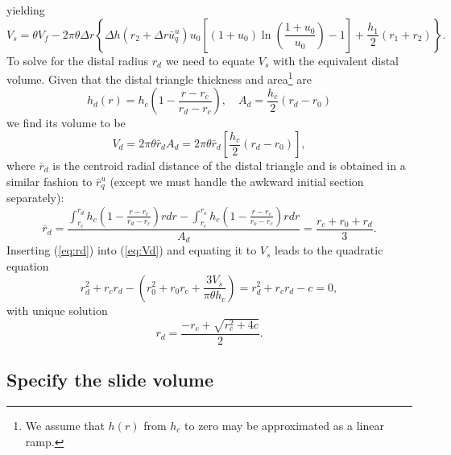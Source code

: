 yielding
\begin{equation}
V_s = \theta V_f - 2 \pi \theta \Delta r \left \{ \Delta h \left ( r_2 + \Delta r\bar{u}_q^u \right ) u_0 \left [ (1 + u_0) \ln \left (\frac{1 + u_0}{u_0} \right ) - 1 \right ] + \frac{h_1}{2} (r_1 + r_2) \right \}.
\label{eq:Vs}
\end{equation}
To solve for the distal radius $r_d$ we need to equate $V_s$ with the equivalent distal volume.
Given that the distal triangle thickness and area\footnote{We assume that $h(r)$ from $h_c$ to zero may be approximated
as a linear ramp.} are
\begin{equation*}
h_d(r) = h_c \left (1 - \frac{r - r_c}{r_d - r_c}\right ), \quad A_d = \frac{h_c}{2} (r_d - r_0)
\end{equation*}
we find its volume to be
\begin{equation}
V_d = 2 \pi \theta \bar{r}_d A_d = 2 \pi \theta \bar{r}_d \left [ \frac{h_c}{2} (r_d - r_0) \right ],
\label{eq:Vd}
\end{equation}
where $\bar{r}_d$ is the centroid radial distance of the distal triangle and is obtained in a similar fashion to $\bar{r}_q^u$
(except we must handle the awkward initial section separately):
\begin{equation}
\bar{r}_d = \frac{\int_{r_c}^{r_d}h_c \left (1 - \frac{r - r_c}{r_d - r_c} \right )rdr - \int_{r_c}^{r_o}h_c \left (1 - \frac{r - r_c}{r_o- r_c} \right )rdr}{A_d} = \frac{r_c + r_0 + r_d}{3}.
\label{eq:rd}
\end{equation}
Inserting (\ref{eq:rd}) into (\ref{eq:Vd}) and equating it to $V_s$ leads to the quadratic equation
\begin{equation*}
r_d^2 + r_c r_d - \left (r_0^2 + r_0 r_c + \frac{3 V_s}{\pi \theta h_c}\right ) = r_d^2 + r_c r_d - c = 0,
\end{equation*}
with unique solution
\begin{equation}
r_d = \frac{-r_c + \sqrt{r_c^2 + 4c}}{2}.
\end{equation}

\subsection{Specify the slide volume}

